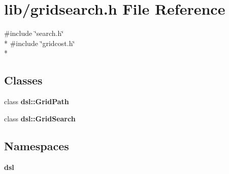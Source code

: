 \section{lib/gridsearch.h File Reference}
\label{gridsearch_8h}
{\ttfamily \#include \char`\"{}search.\-h\char`\"{}}\\*
{\ttfamily \#include \char`\"{}gridcost.\-h\char`\"{}}\\*
\subsection*{Classes}
\begin{DoxyCompactItemize}
\item 
class {\bf dsl\-::\-Grid\-Path}
\item 
class {\bf dsl\-::\-Grid\-Search}
\end{DoxyCompactItemize}
\subsection*{Namespaces}
\begin{DoxyCompactItemize}
\item 
{\bf dsl}
\end{DoxyCompactItemize}
